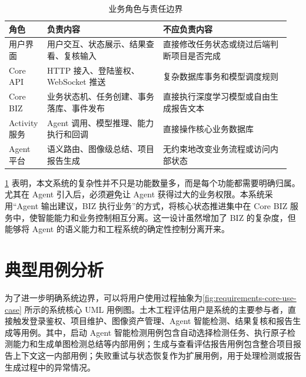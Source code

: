\begin{table}[!htb]
  \caption{业务角色与责任边界}\label{tab:role-boundary}
  \centering
  \begin{tabular}{@{}p{0.11\linewidth}p{0.4\linewidth}p{0.44\linewidth}@{}} \toprule
    \textbf{角色} & \textbf{负责内容} & \textbf{不应负责内容} \\ \midrule
    用户界面 & 用户交互、状态展示、结果查看、复核输入 & 直接修改任务状态或绕过后端判断项目是否完成 \\
    Core API & HTTP 接入、登陆鉴权、WebSocket 推送 & 复杂数据库事务和模型调度规则 \\
    Core BIZ & 业务状态机、任务创建、事务落库、事件发布 & 直接执行深度学习模型或自由生成报告文本 \\
    Activity 服务 & Agent 调用、模型推理、能力执行和回调 & 直接操作核心业务数据库 \\
    Agent 平台 & 语义路由、图像级总结、项目报告生成 & 无约束地改变业务流程或访问内部状态 \\ \bottomrule
  \end{tabular}
\end{table}

\cref{tab:role-boundary} 表明，本文系统的复杂性并不只是功能数量多，而是每个功能都需要明确归属。尤其在 Agent 引入后，必须避免让 Agent 获得过大的业务权限。本系统采用“Agent 输出建议，BIZ 执行业务”的方式，将核心状态推进集中在 Core BIZ 服务中，使智能能力和业务控制相互分离。这一设计虽然增加了 BIZ 的复杂度，但能够将 Agent 的语义能力和工程系统的确定性控制分离开来。

\section{典型用例分析}
\label{sec:requirements-typical-use-case-analysis}

为了进一步明确系统边界，可以将用户使用过程抽象为\cref{fig:requirements-core-use-case} 所示的系统核心 UML 用例图。土木工程评估用户是系统的主要参与者，直接触发登录鉴权、项目维护、图像资产管理、Agent 智能检测、结果复核和报告生成等用例。其中，启动 Agent 智能检测用例包含自动选择检测任务、执行原子检测能力和生成单图检测总结等内部用例；生成与查看评估报告用例包含整合项目报告上下文这一内部用例；失败重试与状态恢复作为扩展用例，用于处理检测或报告生成过程中的异常情况。

